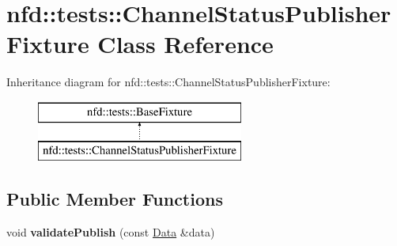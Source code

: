 \hypertarget{classnfd_1_1tests_1_1ChannelStatusPublisherFixture}{}\section{nfd\+:\+:tests\+:\+:Channel\+Status\+Publisher\+Fixture Class Reference}
\label{classnfd_1_1tests_1_1ChannelStatusPublisherFixture}
Inheritance diagram for nfd\+:\+:tests\+:\+:Channel\+Status\+Publisher\+Fixture\+:\begin{figure}[H]
\begin{center}
\leavevmode
\includegraphics[height=2.000000cm]{classnfd_1_1tests_1_1ChannelStatusPublisherFixture}
\end{center}
\end{figure}
\subsection*{Public Member Functions}
\begin{DoxyCompactItemize}
\item 
void {\bfseries validate\+Publish} (const \hyperlink{classndn_1_1Data}{Data} \&data)\hypertarget{classnfd_1_1tests_1_1ChannelStatusPublisherFixture_a7f8d9b73de900703e94948be72f97f4e}{}\label{classnfd_1_1tests_1_1ChannelStatusPublisherFixture_a7f8d9b73de900703e94948be72f97f4e}

\end{DoxyCompactItemize}
